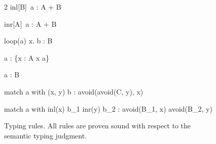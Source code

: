 \begin{figure}[t]
\begin{multicols}{2}
{\Gamma \vDash \textsf{inl}[B]\, a : A + B}

{\Gamma \vDash \textsf{inr}[A]\, a : A + B}

{\Gamma \vDash \textsf{loop}(a)\; x.\; b : B}

{\Gamma \vDash a : \{x : A \mid x \mathbin{\texttt{==}} a\}}

{\Gamma \vDash a : B}

\end{multicols}

{\Gamma \vDash \textsf{match}\; a \;\textsf{with}\; (x, y) \Rightarrow b : \textsf{avoid}(\textsf{avoid}(C, y), x)}

{\Gamma \vDash \textsf{match}\; a \;\textsf{with}\; \textsf{inl}(x) \Rightarrow b_1 \mid \textsf{inr}(y) \Rightarrow b_2 : \textsf{avoid}(B_1, x) \lor \textsf{avoid}(B_2, y)}

\vspace{-1em}
\caption{Typing rules. All rules are proven sound with respect to the semantic typing judgment.}\label{fig:typing}
\end{figure}
